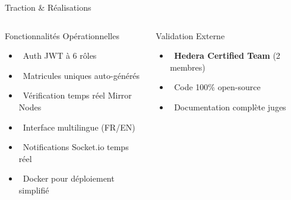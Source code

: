 \documentclass[aspectratio=169,11pt]{beamer}
\begin{document}
\begin{frame}{Traction \& Réalisations}
\begin{columns}[T]
\begin{block}{Fonctionnalités Opérationnelles}
\small
\begin{itemize}
    \item \faLock~Auth JWT à 6 rôles
    \item \faBarcode~Matricules uniques auto-générés
    \item \faSearch~Vérification temps réel Mirror Nodes
    \item \faLanguage~Interface multilingue (FR/EN)
    \item \faBell~Notifications Socket.io temps réel
    \item \faDocker~Docker pour déploiement simplifié
\end{itemize}
\end{block}

\vspace{0.3cm}

\begin{alertblock}{Validation Externe}
\small
\begin{itemize}
    \item \faCertificate~\textbf{Hedera Certified Team} (2 membres)
    \item \faGithub~Code 100\% open-source
    \item \faBook~Documentation complète juges
\end{itemize}
\end{alertblock}
\end{columns}

\end{frame}
\end{document}
